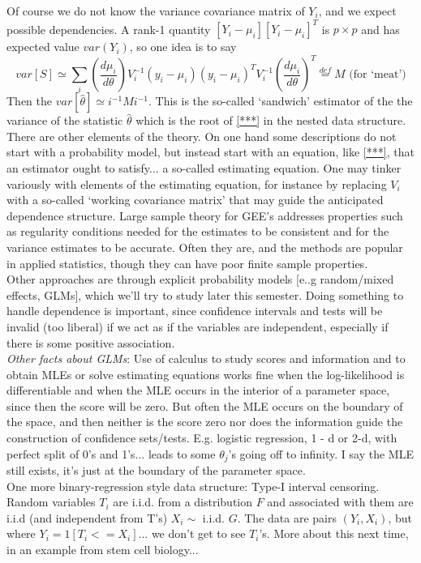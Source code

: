\documentclass[11pt,a4paper]{article}
\begin{document}
Of course we do not know the variance covariance matrix of $Y_i$, and we expect possible dependencies.  A rank-1 quantity  $[Y_i - \mu_i ] [ Y_i - \mu_i ]^T$ is $p\times p$ and has expected value $var(Y_i)$, so one idea is to say
$$var[ S ] \simeq \sum_i \left(\frac{d\mu_i}{d \theta} \right) V_i^{-1}   (y_i - \mu_i) ( y_i - \mu_i )^T  V_i^{-1}\left(\frac{d\mu_i}{d \theta} \right)^T \stackrel{def}{=} M \text{ (for `meat')}$$
Then the $var[ \hat{\theta}] \simeq i^{-1} M i^{-1}$. This is the so-called `sandwich' estimator of the the variance of the statistic $\hat{\theta}$ which is the root of \eqref{***} in the nested data structure.  \\
There are other elements of the theory.  On one hand some descriptions do not start with a probability model, but instead start with an equation, like \eqref{***}, that an estimator ought to satisfy... a so-called estimating equation.  One may tinker variously with elements of the estimating equation, for instance by replacing $V_i$ with a so-called `working covariance matrix' that may guide the anticipated dependence structure.  Large sample theory for GEE's addresses properties such as regularity conditions needed for the estimates to be consistent and for the variance estimates to be accurate. Often they are, and the methods are popular in applied statistics, though they can have poor finite sample properties.\\
Other approaches are through explicit probability models [e..g random/mixed effects, GLMs], which we'll try to study later this semester.  Doing something to handle dependence is important, since confidence intervals and tests will be invalid (too liberal) if we act as if the variables are independent, especially if there is some positive association.\\
\emph{Other facts about GLMs}:  Use of calculus to study scores and information and to obtain MLEs or solve estimating equations works fine when the log-likelihood is differentiable and when the MLE occurs in the interior of a parameter space, since then the score will be zero. But often the MLE occurs on the boundary of the space, and then neither is the score zero nor does the information guide the construction of confidence sets/tests.  E.g. logistic regression, 1 - d or 2-d, with perfect split of 0's and 1's... leads to some $\theta_j$'s going off to infinity.  I say the MLE still exists, it's just at the boundary of the parameter space.\\
One more binary-regression style data structure:  Type-I interval censoring.\\
Random variables $T_i$ are i.i.d. from a distribution $F$ and associated with them are i.i.d (and independent from T's) $X_i \sim$ i.i.d. $G$. The data are pairs $(Y_i, X_i)$, but where $Y_i = 1[ T_i <= X_i ]$... we don't get to see $T_i$'s. More about this next time, in an example from stem cell biology...
\end{document}

